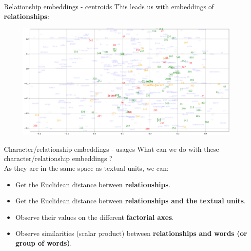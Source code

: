 \documentclass[10pt]{beamer}
\newcommand{\imp}[1]{\textbf{\color{cyan}#1}}
\begin{document}
	
	\begin{frame}{Relationship embeddings - centroids}
		This leads us with embeddings of \imp{relationships}:
		\begin{figure}
			\centering
			\includegraphics[width=\textwidth]{img/occ_embeddings.png}
		\end{figure}
	\end{frame}
	
	
	\begin{frame}{Character/relationship embeddings - usages}
		What can we do with these character/relationship embeddings ? \\
		\vspace{0.3cm}
		As they are in the same space as textual units, we can: 
		\begin{itemize}
			\item Get the Euclidean distance between \imp{relationships}.
			\item Get the Euclidean distance between \imp{relationships and the textual units}.
			\item Observe their values on the different \imp{factorial axes}. 
			\item Observe similarities (scalar product) between \imp{relationships and words (or group of words)}.
		\end{itemize}
	\end{frame}
	
	
\end{document}
